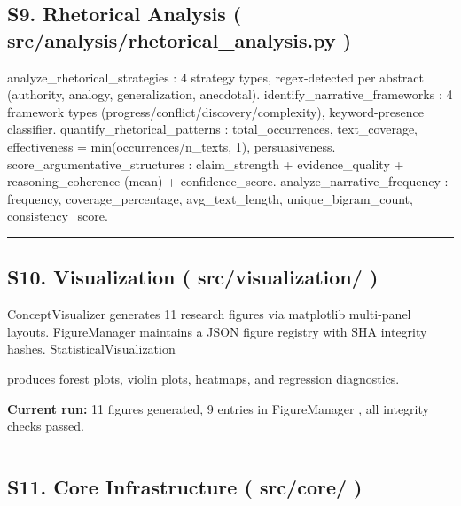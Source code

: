 \documentclass[
]{article}
\numberwithin{equation}{section}
\renewcommand{\texttt}[1]{%
    \colorbox{codebg}{\color{codefg}\ttfamily #1}%
}
\begin{document}
\subsection{\texorpdfstring{S9. Rhetorical Analysis
(\texttt{src/analysis/rhetorical\_analysis.py})}{S9. Rhetorical Analysis (src/analysis/rhetorical\_analysis.py)}}\label{s9.-rhetorical-analysis-srcanalysisrhetorical_analysis.py}

\texttt{analyze\_rhetorical\_strategies}: 4 strategy types,
regex-detected per abstract (authority, analogy, generalization,
anecdotal). \texttt{identify\_narrative\_frameworks}: 4 framework types
(progress/conflict/discovery/complexity), keyword-presence classifier.
\texttt{quantify\_rhetorical\_patterns}: total\_occurrences,
text\_coverage, effectiveness = min(occurrences/n\_texts, 1),
persuasiveness. \texttt{score\_argumentative\_structures}:
claim\_strength + evidence\_quality + reasoning\_coherence (mean) +
confidence\_score. \texttt{analyze\_narrative\_frequency}: frequency,
coverage\_percentage, avg\_text\_length, unique\_bigram\_count,
consistency\_score.

\begin{center}\rule{0.5\linewidth}{0.5pt}\end{center}

\subsection{\texorpdfstring{S10. Visualization
(\texttt{src/visualization/})}{S10. Visualization (src/visualization/)}}\label{s10.-visualization-srcvisualization}

\texttt{ConceptVisualizer} generates 11 research figures via matplotlib
multi-panel layouts. \texttt{FigureManager} maintains a JSON figure
registry with SHA integrity hashes. \texttt{StatisticalVisualization}
produces forest plots, violin plots, heatmaps, and regression
diagnostics.

\textbf{Current run:} 11 figures generated, 9 entries in
\texttt{FigureManager}, all integrity checks passed.

\begin{center}\rule{0.5\linewidth}{0.5pt}\end{center}

\subsection{\texorpdfstring{S11. Core Infrastructure
(\texttt{src/core/})}{S11. Core Infrastructure (src/core/)}}\label{s11.-core-infrastructure-srccore}
\end{document}
